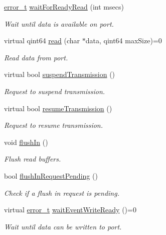 \begin{DoxyCompactItemize}
\hyperlink{classmdt_abstract_port_ad4121bb930c95887e77f8bafa065a85e}{error\-\_\-t} \hyperlink{classmdt_abstract_port_a47f4db2e72b5fd3e32162e6a898fd391}{wait\-For\-Ready\-Read} (int msecs)
\begin{DoxyCompactList}\small\item\em Wait until data is available on port. \end{DoxyCompactList}\item 
virtual qint64 \hyperlink{classmdt_abstract_port_a9d9c45220d5328c9856a2445557fe970}{read} (char $\ast$data, qint64 max\-Size)=0
\begin{DoxyCompactList}\small\item\em Read data from port. \end{DoxyCompactList}\item 
virtual bool \hyperlink{classmdt_abstract_port_aff3d79248baf96e670eba6d2fef700b9}{suspend\-Transmission} ()
\begin{DoxyCompactList}\small\item\em Request to suspend transmission. \end{DoxyCompactList}\item 
virtual bool \hyperlink{classmdt_abstract_port_ad4a04c995df881593db0a309000be7a7}{resume\-Transmission} ()
\begin{DoxyCompactList}\small\item\em Request to resume transmission. \end{DoxyCompactList}\item 
void \hyperlink{classmdt_abstract_port_a32329b4188db796401e4f454755acb44}{flush\-In} ()
\begin{DoxyCompactList}\small\item\em Flush read buffers. \end{DoxyCompactList}\item 
bool \hyperlink{classmdt_abstract_port_a54b7bfb725c91b2c292a39275b877207}{flush\-In\-Request\-Pending} ()
\begin{DoxyCompactList}\small\item\em Check if a flush in request is pending. \end{DoxyCompactList}\item 
virtual \hyperlink{classmdt_abstract_port_ad4121bb930c95887e77f8bafa065a85e}{error\-\_\-t} \hyperlink{classmdt_abstract_port_a35e4686f50e2c53c7e3618cf2c485d92}{wait\-Event\-Write\-Ready} ()=0
\begin{DoxyCompactList}\small\item\em Wait until data can be written to port. \end{DoxyCompactList}\item 

\end{DoxyCompactItemize}

